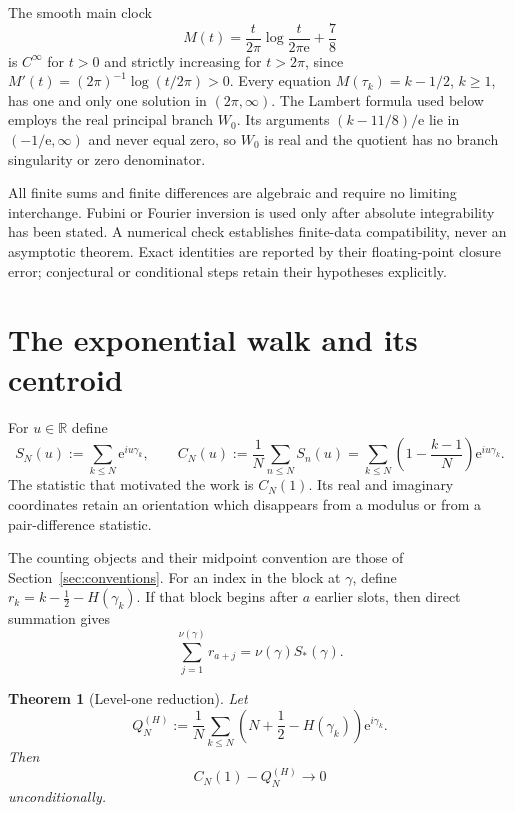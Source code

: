 \documentclass[11pt]{amsart}
\newtheorem{theorem}{Theorem}[section]
\theoremstyle{definition}
\theoremstyle{remark}
\newcommand{\ee}{\mathrm e}
\begin{document}
The smooth main clock
\begin{equation}\label{eq:M_domain}
M(t)=\frac{t}{2\pi}\log\frac{t}{2\pi\ee}+\frac78
\end{equation}
is $C^\infty$ for $t>0$ and strictly increasing for $t>2\pi$, since
$M'(t)=(2\pi)^{-1}\log(t/2\pi)>0$.  Every equation
$M(\tau_k)=k-1/2$, $k\ge1$, has one and only one solution in $(2\pi,\infty)$.
The Lambert formula used below employs the real principal branch $W_0$.  Its
arguments $(k-11/8)/\ee$ lie in $(-1/\ee,\infty)$ and never equal zero, so
$W_0$ is real and the quotient has no branch singularity or zero denominator.

All finite sums and finite differences are algebraic and require no limiting
interchange.  Fubini or Fourier inversion is used only after absolute
integrability has been stated.  A numerical check establishes finite-data
compatibility, never an asymptotic theorem.  Exact identities are reported by
their floating-point closure error; conjectural or conditional steps retain
their hypotheses explicitly.

\section{The exponential walk and its centroid}

For $u\in\mathbb R$ define
\begin{equation}\label{eq:walk_centroid}
S_N(u):=\sum_{k\leq N}\ee^{iu\gamma_k},
\qquad
C_N(u):=\frac1N\sum_{n\leq N}S_n(u)
=\sum_{k\leq N}\left(1-\frac{k-1}{N}\right)\ee^{iu\gamma_k}.
\end{equation}
The statistic that motivated the work is $C_N(1)$.  Its real and imaginary
coordinates retain an orientation which disappears from a modulus or from a
pair-difference statistic.

The counting objects and their midpoint convention are those of
Section~\ref{sec:conventions}.  For an index in the block at $\gamma$, define
$r_k=k-\tfrac12-H(\gamma_k)$.  If that block begins after $a$ earlier slots,
then direct summation gives
\begin{equation}\label{eq:block_defect}
\sum_{j=1}^{\nu(\gamma)}r_{a+j}=\nu(\gamma)S_*(\gamma).
\end{equation}

\begin{theorem}[Level-one reduction]\label{thm:level_one}
Let
\[
Q_N^{(H)}:=\frac1N\sum_{k\leq N}
\left(N+\frac12-H(\gamma_k)\right)\ee^{i\gamma_k}.
\]
Then
\begin{equation}\label{eq:level_one}
C_N(1)-Q_N^{(H)}\longrightarrow0
\end{equation}
unconditionally.
\end{theorem}
\end{document}
